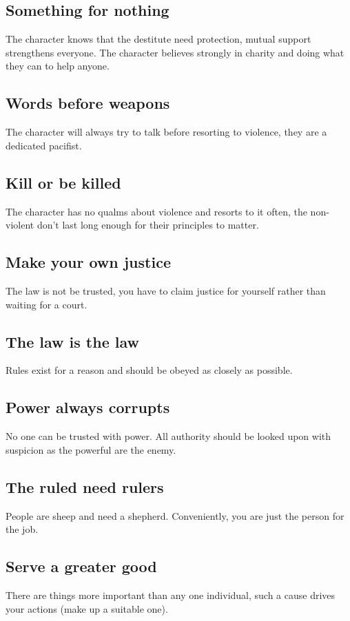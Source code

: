 \documentclass[a4paper,10pt,oneside]{book}
\begin{document}
\subsection{Something for nothing}
The character knows that the destitute need protection, mutual support strengthens everyone. The character believes strongly in charity and doing what they can to help anyone.

\subsection{Words before weapons}
The character will always try to talk before resorting to violence, they are a dedicated pacifist.

\subsection{Kill or be killed}
The character has no qualms about violence and resorts to it often, the non-violent don't last long enough for their principles to matter.

\subsection{Make your own justice}
The law is not be trusted, you have to claim justice for yourself rather than waiting for a court. 

\subsection{The law is the law}
Rules exist for a reason and should be obeyed as closely as possible.

\subsection{Power always corrupts}
No one can be trusted with power. All authority should be looked upon with suspicion as the powerful are the enemy.

\subsection{The ruled need rulers}
People are sheep and need a shepherd. Conveniently, you are just the person for the job.

\subsection{Serve a greater good}
There are things more important than any one individual, such a cause drives your actions (make up a suitable one).
\end{document}
